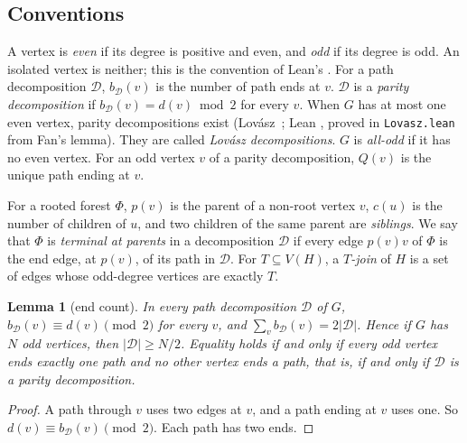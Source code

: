 \documentclass[11pt]{amsart}
\newtheorem{lemma}[theorem]{Lemma}
\theoremstyle{definition}
\newcommand{\cD}{\mathcal D}
\begin{document}
\subsection{Conventions}
A vertex is \emph{even} if its degree is positive and even, and \emph{odd} if its degree is odd. An
isolated vertex is neither; this is the convention of Lean's . For a path decomposition
$\cD$, $b_\cD(v)$ is the number of path ends at $v$. $\cD$ is a \emph{parity decomposition} if
$b_\cD(v)=d(v)\bmod 2$ for every $v$. When $G$ has at most one even vertex, parity decompositions exist
(Lov\'asz~\cite{L68}; Lean , proved in \texttt{Lovasz.lean} from Fan's lemma).
They are called \emph{Lov\'asz decompositions}. $G$ is \emph{all-odd} if it has no even vertex. For an
odd vertex $v$ of a parity decomposition, $Q(v)$ is the unique path ending at $v$.

For a rooted forest $\Phi$, $p(v)$ is the parent of a non-root vertex $v$, $c(u)$ is the number of
children of $u$, and two children of the same parent are \emph{siblings}. We say that $\Phi$ is
\emph{terminal at parents} in a decomposition $\cD$ if every edge $p(v)v$ of $\Phi$ is the end edge,
at $p(v)$, of its path in $\cD$. For $T\subseteq V(H)$, a \emph{$T$-join} of $H$ is a set of edges whose
odd-degree vertices are exactly $T$.

\begin{lemma}[end count]\label{lem:count}
In every path decomposition $\cD$ of $G$, $b_\cD(v)\equiv d(v)\pmod 2$ for every $v$, and
$\sum_vb_\cD(v)=2|\cD|$. Hence if $G$ has $N$ odd vertices, then $|\cD|\ge N/2$. Equality holds if and only if
every odd vertex ends exactly one path and no other vertex ends a path, that is, if and only if $\cD$ is a
parity decomposition.
\end{lemma}

\begin{proof}
A path through $v$ uses two edges at $v$, and a path ending at $v$ uses one. So
$d(v)\equiv b_\cD(v)\pmod 2$. Each path has two ends.
\end{proof}
\end{document}
